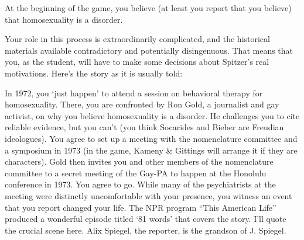 At the beginning of the game, you believe (at least you report that you believe) that homosexuality is a disorder.

Your role in this process is extraordinarily complicated, and the historical materials available contradictory and potentially disingenuous. That means that you, as the student, will have to make some decisions about Spitzer's real motivations. Here's the story as it is usually told:

In 1972, you `just happen' to attend a session on behavioral therapy for homosexuality. There, you are confronted by Ron Gold, a journalist and gay activist, on why you believe homosexuality is a disorder. He challenges you to cite reliable evidence, but you can't (you think Socarides and Bieber are Freudian ideologues). You agree to set up a meeting with the nomenclature committee and a symposium in 1973 (in the game, Kameny \& Gittings will arrange it if they are characters). Gold then invites you and other members of the nomenclature committee to a secret meeting of the Gay-PA to happen at the Honolulu conference in 1973. You agree to go. While many of the psychiatrists at the meeting were distinctly uncomfortable with your presence, you witness an event that you report changed your life. The NPR program ``This American Life'' produced a wonderful episode titled `81 words' that covers the story. I'll quote the crucial scene here. Alix Spiegel, the reporter, is the grandson of J. Spiegel.

